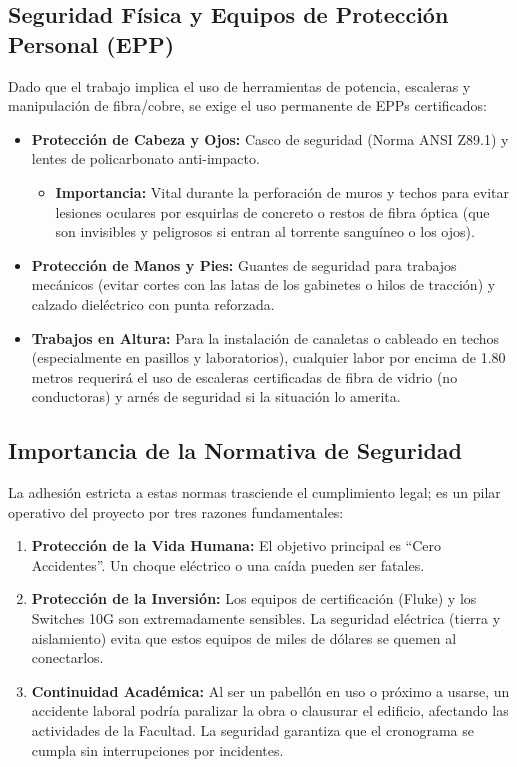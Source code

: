 \subsection*{Seguridad Física y Equipos de Protección Personal (EPP)}

Dado que el trabajo implica el uso de herramientas de potencia, escaleras y manipulación de fibra/cobre, se exige el uso permanente de EPPs certificados:

\begin{itemize}
    \item \textbf{Protección de Cabeza y Ojos:} Casco de seguridad (Norma ANSI Z89.1) y lentes de policarbonato anti-impacto.
    \begin{itemize}
        \item \textbf{Importancia:} Vital durante la perforación de muros y techos para evitar lesiones oculares por esquirlas de concreto o restos de fibra óptica (que son invisibles y peligrosos si entran al torrente sanguíneo o los ojos).
    \end{itemize}
    \item \textbf{Protección de Manos y Pies:} Guantes de seguridad para trabajos mecánicos (evitar cortes con las latas de los gabinetes o hilos de tracción) y calzado dieléctrico con punta reforzada.
    \item \textbf{Trabajos en Altura:} Para la instalación de canaletas o cableado en techos (especialmente en pasillos y laboratorios), cualquier labor por encima de 1.80 metros requerirá el uso de escaleras certificadas de fibra de vidrio (no conductoras) y arnés de seguridad si la situación lo amerita.
\end{itemize}

\subsection*{Importancia de la Normativa de Seguridad}

La adhesión estricta a estas normas trasciende el cumplimiento legal; es un pilar operativo del proyecto por tres razones fundamentales:

\begin{enumerate}
    \item \textbf{Protección de la Vida Humana:} El objetivo principal es ``Cero Accidentes''. Un choque eléctrico o una caída pueden ser fatales.
    \item \textbf{Protección de la Inversión:} Los equipos de certificación (Fluke) y los Switches 10G son extremadamente sensibles. La seguridad eléctrica (tierra y aislamiento) evita que estos equipos de miles de dólares se quemen al conectarlos.
    \item \textbf{Continuidad Académica:} Al ser un pabellón en uso o próximo a usarse, un accidente laboral podría paralizar la obra o clausurar el edificio, afectando las actividades de la Facultad. La seguridad garantiza que el cronograma se cumpla sin interrupciones por incidentes.
\end{enumerate}


